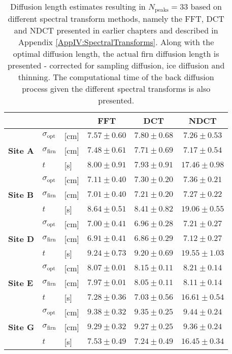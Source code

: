 \documentclass[../../CompleteThesis2/Complete_2ndDraft]{subfiles}
\begin{document}
\begin{table}[ht]
	\centering
	\begin{tabular}{l l l | c | c | c}
		& & & FFT & DCT & NDCT \\[0.15cm]
		\hline
		\hline 
		\multirow{3}{*}{\textbf{Site A}} & $\sigma_{\text{opt}}$ & [cm] & $7.57 \pm 0.60$ & $7.80 \pm 0.68$ & $7.26 \pm 0.53$ \\[0.1cm]
		& $\sigma_{\text{firn}}$ & [cm] & $7.48 \pm 0.61$ & $7.71\pm 0.69$ & $7.17 \pm 0.54$\\[0.5cm]
		& $t$ & [s] & $8.00 \pm 0.91$ & $7.93 \pm 0.91$ & $17.46 \pm 0.98$ \\[0.1cm]
		\hline
		
		\multirow{3}{*}{\textbf{Site B}} & $\sigma_{\text{opt}}$ & [cm] & $7.11 \pm 0.40$ & $7.30 \pm 0.20$ & $7.36 \pm 0.21$ \\[0.1cm]
		& $\sigma_{\text{firn}}$ & [cm] & $7.01 \pm 0.40$ & $7.21 \pm 0.20$ & $7.27 \pm 0.22$\\[0.5cm]
		& $t$ & [s] & $8.64 \pm 0.51$ & $8.41 \pm 0.82$ & $19.06 \pm 0.55$ \\[0.1cm]
		\hline
		
		\multirow{3}{*}{\textbf{Site D}} & $\sigma_{\text{opt}}$ & [cm] & $7.00 \pm 0.41$ & $6.96 \pm 0.28$ & $7.21 \pm 0.27$ \\[0.1cm]
		& $\sigma_{\text{firn}}$ & [cm] & $6.91 \pm 0.41$ & $6.86\pm 0.29$ & $7.12\pm 0.27$\\[0.5cm]
		& $t$ & [s] & $9.24 \pm 0.73$ & $9.20 \pm 0.69$ & $19.55 \pm 1.03$ \\[0.1cm]
		\hline
		
		\multirow{3}{*}{\textbf{Site E}} & $\sigma_{\text{opt}}$ & [cm] & $8.07 \pm 0.01$ & $8.15 \pm 0.11$ & $8.21 \pm 0.14$ \\[0.1cm]
		& $\sigma_{\text{firn}}$ & [cm] & $7.97 \pm 0.01$ & $8.05\pm 0.11$ & $8.11\pm 0.14$\\[0.5cm]
		& $t$ & [s] & $7.28 \pm 0.36$ & $7.03 \pm 0.56$ & $16.61 \pm 0.54$ \\[0.1cm]
		\hline
		
		\multirow{3}{*}{\textbf{Site G}} & $\sigma_{\text{opt}}$ & [cm] & $9.38 \pm 0.32$ & $9.35 \pm 0.25$ & $9.44 \pm 0.24$ \\[0.1cm]
		& $\sigma_{\text{firn}}$ & [cm] & $9.29\pm 0.32$ & $9.27\pm 0.25$& $9.36\pm 0.24$ \\[0.5cm]
		& $t$ & [s] & $7.53 \pm 0.49$ & $7.24 \pm 0.49$ & $16.45 \pm 0.34$ \\[0.1cm]
		\hline
	\end{tabular}
	\caption[$\sigma$ Estimates Given Spectral Transforms]{\small Diffusion length estimates resulting in $N_{\text{peaks}}=33$ based on different spectral transform methods, namely the FFT, DCT and NDCT presented in earlier chapters and described in Appendix \ref{AppIV:SpectralTransforms}. Along with the optimal diffusion length, the actual firn diffusion length is presented - corrected for sampling diffusion, ice diffusion and thinning. The computational time of the back diffusion process given the different spectral transforms is also presented.}
	\label{Tab:DiffLens_SpecTrans}
\end{table}
\end{document}
